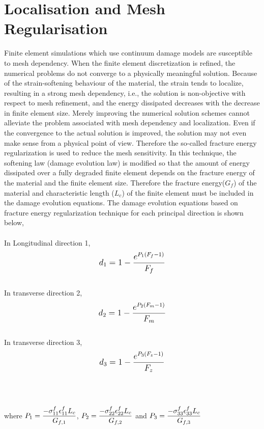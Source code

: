 \documentclass[a4paper,12pt,twoside]{report}
\begin{document}
\section{Localisation and Mesh Regularisation}\label{Mesh Regularisation}
\indent\indent\indent Finite element simulations which use continuum damage models are susceptible to mesh dependency. When the finite element discretization is refined, the numerical problems do not converge to a physically meaningful solution. Because of the strain-softening behaviour of the material, the strain tends to localize, resulting in a strong mesh dependency, i.e., the solution is non-objective with respect to mesh refinement, and the energy dissipated decreases with the decrease in finite element size. Merely improving the numerical solution schemes cannot alleviate the problem associated with mesh dependency and localization. Even if the convergence to the actual solution is improved, the solution may not even make sense from a physical point of view. Therefore the so-called fracture energy regularization is used to reduce the mesh sensitivity. In this technique, the softening law (damage evolution law) is modified so that the amount of energy dissipated over a fully degraded finite element depends on the fracture energy of the material and the finite element size. Therefore the fracture energy($G_f$) of the material and characteristic length ($L_{c}$) of the finite element must be included in the damage evolution equations. The damage evolution equations based on fracture energy regularization technique for each principal direction is shown below, \\
\\
In Longitudinal direction 1,
\begin{equation}
\label{d1}
\mathlarger{d_{1} = 1 - \frac{e^{P_{1}(F_{f} - 1)}}{F_{f}}}
\end{equation}
\\
In transverse direction 2,
\begin{equation}
\label{d2}  
\mathlarger{d_{2} = 1 - \frac{e^{P_{2}(F_{m} - 1)}}{F_{m}}}
\end{equation}
\\
In transverse direction 3,
\begin{equation}
\label{d3} 
\mathlarger{d_{3} = 1 - \frac{e^{P_{3}(F_{z} - 1)}}{F_{z}}}
\end{equation}
\\
\\
\\
where $\mathlarger{P_{1} = \frac{-\sigma_{11}^{f}\epsilon_{11}^{f}L_{c}}{G_{f,1}}}$, $\mathlarger{P_{2} = \frac{-\sigma_{22}^{f}\epsilon_{22}^{f}L_{c}}{G_{f,2}}}$ and $\mathlarger{P_{3} = \frac{-\sigma_{33}^{f}\epsilon_{33}^{f}L_{c}}{G_{f,3}}}$ 
\end{document}
